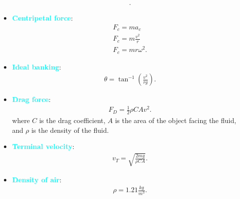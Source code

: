 \documentclass{report}
\begin{document}
\begin{itemize}
\begin{align*}
            .\end{align*}
        \item \textbf{\textcolor{cyan}{Centripetal force}}:
            \begin{align*}
                F_{c} = ma_{c} \\
                F_{c} = m \frac{v^{2}}{r} \\
                F_{c} = mr\omega^{2}
            .\end{align*}
        \item \textbf{\textcolor{cyan}{Ideal banking}}:
            \begin{align*}
                \theta  = \tan^{-1}{\left(\frac{v^{2}}{rg}\right)}
            .\end{align*}
        \item \textbf{\textcolor{cyan}{Drag force}}:
            \begin{align*}
                F_{D} = \frac{1}{2}\rho CAv^{2}
            .\end{align*}
            where $C$ is the drag coefficient, $A$ is the area of the object facing the fluid, and $\rho$ is the density of the fluid.
        \item \textbf{\textcolor{cyan}{Terminal velocity}}:
            \begin{align*}
                v_{T} = \sqrt{\frac{2mg}{\rho CA}}
            .\end{align*}
        \item \textbf{\textcolor{cyan}{Density of air}}:
            \begin{align*}
                \rho = 1.21 \frac{kg}{m^{3}}
            .\end{align*}
    \end{itemize}

    \pagebreak 
\end{document}
